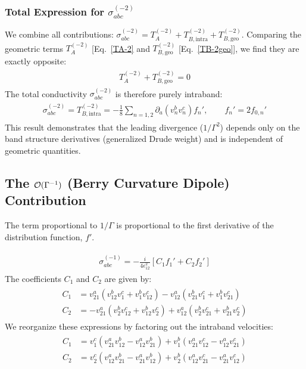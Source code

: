 \documentclass[twocolumn, prx, reprint, amsfonts, amsmath, amssymb, longbibliography, floatfix, aps]{revtex4-2}
\begin{document}
\subsubsection*{Total Expression for \texorpdfstring{$\sigma_{abc}^{(-2)}$}{sigma-abc-2}}
We combine all contributions: $\sigma_{abc}^{(-2)} = T_A^{(-2)} + T_{B, \text{intra}}^{(-2)} + T_{B, \text{geo}}^{(-2)}$.
Comparing the geometric terms $T_A^{(-2)}$ [Eq.~\eqref{TA-2} and $T_{B, \text{geo}}^{(-2)}$ [Eq.~\eqref{TB-2geo}], we find they are exactly opposite:
\begin{align}
\begin{aligned}
T_A^{(-2)} + T_{B, \text{geo}}^{(-2)} = 0
\end{aligned}
\end{align}
The total conductivity $\sigma_{abc}^{(-2)}$ is therefore purely intraband:
\begin{align}
\begin{aligned}
\sigma_{abc}^{(-2)} = T_{B, \text{intra}}^{(-2)} = -\frac{1}{8} \sum_{n=1,2} \partial_a(v_n^b v_n^c) f_n',
\qquad
f_n' = 2 f_{0,n}'
\end{aligned}
\end{align}
This result demonstrates that the leading divergence ($1/\Gamma^2$) depends only on the band structure derivatives (generalized Drude weight) and is independent of geometric quantities.

\subsection{The \texorpdfstring{${\cal O}(\Gamma^{-1})$}{O(Gamma-1)} (Berry Curvature Dipole) Contribution}

The term proportional to $1/\Gamma$ is proportional to the first derivative of the distribution function, $f'$.

\begin{align}
\begin{aligned}
\sigma_{abc}^{(-1)} = -\frac{i}{4\epsilon_{12}^2} [ C_1 f_1' + C_2 f_2' ]
\label{sigma_abc_-1}
\end{aligned}
\end{align}
The coefficients $C_1$ and $C_2$ are given by:
\begin{align}
\begin{aligned}
C_1 &= v_{21}^a(v_{12}^b v_1^c + v_1^b v_{12}^c) - v_{12}^a(v_{21}^b v_1^c + v_1^b v_{21}^c) \\
C_2 &= -v_{21}^a(v_2^b v_{12}^c + v_{12}^b v_2^c) + v_{12}^a(v_2^b v_{21}^c + v_{21}^b v_2^c)
\end{aligned}
\end{align}
We reorganize these expressions by factoring out the intraband velocities:
\begin{align}
\begin{aligned}
C_1 &= v_1^c (v_{21}^a v_{12}^b - v_{12}^a v_{21}^b) + v_1^b (v_{21}^a v_{12}^c - v_{12}^a v_{21}^c) \\
C_2 &= v_2^c (v_{12}^a v_{21}^b - v_{21}^a v_{12}^b) + v_2^b (v_{12}^a v_{21}^c - v_{21}^a v_{12}^c)
\label{C1C2-1}
\end{aligned}
\end{align}
\end{document}
